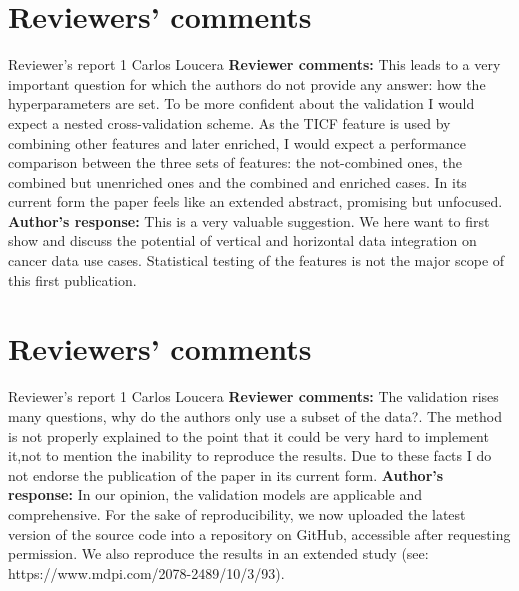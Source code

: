 \documentclass{bmcart}
\begin{document}
\begin{backmatter}
\section*{Reviewers' comments}
\newline Reviewer's report 1
\newline Carlos Loucera
\newline \textbf{Reviewer comments:}
This leads to a very important question for which the authors do not provide any answer: how the hyperparameters are set. To be more confident about the validation I would expect a nested cross-validation scheme. As the TICF feature is used by combining other features and later enriched, I would expect a performance comparison between the three sets of features: the not-combined ones, the combined but unenriched ones and the combined and enriched cases. In its current form the paper feels like an extended abstract, promising but unfocused.
\newline \textbf{Author's response:}
This is a very valuable suggestion. We here want to first show and discuss the potential of vertical and horizontal data integration on cancer data use cases. Statistical testing of the features is not the major scope of this first publication.

\section*{Reviewers' comments}
\newline Reviewer's report 1
\newline Carlos Loucera
\newline \textbf{Reviewer comments:}
The validation rises many questions, why do the authors only use a subset of the data?. The method is not properly explained to the point that it could be very hard to implement it,not to mention the inability to reproduce the results.  Due to these facts I do not endorse the publication of the paper in its current form.
\newline \textbf{Author's response:}
In our opinion, the validation models are applicable and comprehensive. For the sake of reproducibility, we now uploaded the latest version of the source code into a repository on GitHub, accessible after requesting permission. We also reproduce the results in an extended study (see: https://www.mdpi.com/2078-2489/10/3/93).




\end{backmatter}
\end{document}
